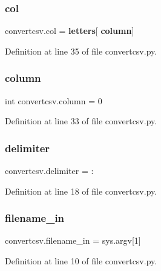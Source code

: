 \mbox{\label{namespaceconvertcsv_a33a5ce45c5f8a3b185622649328b6344}} 
\subsubsection{col}
{\footnotesize\ttfamily convertcsv.\+col = \textbf{ letters}[\textbf{ column}]}



Definition at line 35 of file convertcsv.\+py.

\mbox{\label{namespaceconvertcsv_afdae56af1db749709a96660f3ae2e238}} 
\subsubsection{column}
{\footnotesize\ttfamily int convertcsv.\+column = 0}



Definition at line 33 of file convertcsv.\+py.

\mbox{\label{namespaceconvertcsv_ae6f998a7ab654dc0660b81f5290447a1}} 
\subsubsection{delimiter}
{\footnotesize\ttfamily convertcsv.\+delimiter = \textquotesingle{}\+:\textquotesingle{}}



Definition at line 18 of file convertcsv.\+py.

\mbox{\label{namespaceconvertcsv_af0c099c034b7bb1e8890a06802a62286}} 
\subsubsection{filename\+\_\+in}
{\footnotesize\ttfamily convertcsv.\+filename\+\_\+in = sys.\+argv[1]}



Definition at line 10 of file convertcsv.\+py.

\mbox{\label{namespaceconvertcsv_ab96c6b7c801e62a1d1836b69e495e92d}} 
